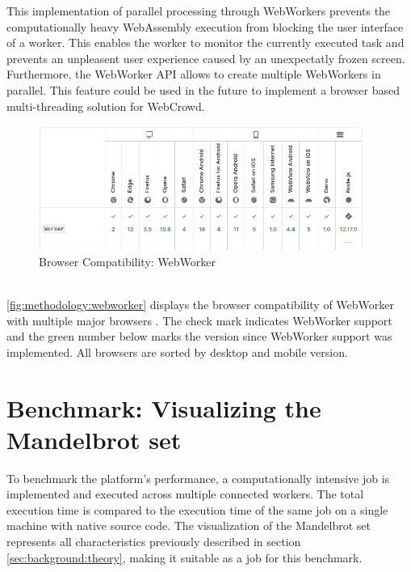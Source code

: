 This implementation of parallel processing through WebWorkers prevents the computationally heavy WebAssembly execution from blocking the user interface of a worker. This enables the worker to monitor the currently executed task and prevents an unpleasent user experience caused by an unexpectatly frozen screen. Furthermore, the WebWorker \ac{API} allows to create multiple WebWorkers in parallel. This feature could be used in the future to implement a browser based multi-threading solution for WebCrowd.
\begin{figure}[htbp]
  \centering
  \includegraphics[width=0.95\textwidth]{gfx/figures/webworker-browsercompability.png}
  \caption{Browser Compatibility: WebWorker \cite{methodology:webworkers}}
  \label{fig:methodology:webworker}
\end{figure}
~\\
\autoref{fig:methodology:webworker} displays the browser compatibility of WebWorker with multiple major browsers \cite{methodology:webworkers}. The check mark indicates WebWorker support and the green number below marks the version since WebWorker support was implemented. All browsers are sorted by desktop and mobile version. 

\section{Benchmark: Visualizing the Mandelbrot set}
\label{sec:methodology:benchmark}
To benchmark the platform's performance, a computationally intensive job is implemented and executed across multiple connected workers. The total execution time is compared to the execution time of the same job on a single machine with native source code. The visualization of the Mandelbrot set represents all characteristics previously described in section \ref{sec:background:theory}, making it suitable as a job for this benchmark.

